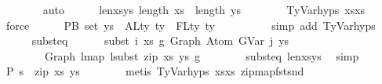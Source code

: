 \begin{isabellebody}
\ \ \ \ \ \ \isamarkupfalse%
\ auto\isanewline
\isanewline
\ \ \ \ \isamarkupfalse%
\ len{\isacharunderscore}{\kern0pt}xs{\isacharunderscore}{\kern0pt}ys{\isacharcolon}{\kern0pt}\ {\isachardoublequoteopen}length\ xs\ {\isacharequal}{\kern0pt}\ length\ ys{\isachardoublequoteclose}\isanewline
\ \ \ \ \ \ \isamarkupfalse%
\ TyVar{\isachardot}{\kern0pt}hyps{\isacharparenleft}{\kern0pt}{}{\isacharcomma}{\kern0pt}{}{\isacharparenright}{\kern0pt}\ xs{\isacharprime}{\kern0pt}{\isacharunderscore}{\kern0pt}xs\ \isamarkupfalse%
\ force\isanewline
\isanewline
\ \ \ \ \isamarkupfalse%
\ P{}B{\isacharcolon}{\kern0pt}\ {\isachardoublequoteopen}set\ ys\ {\isasyminter}\ ALty\ ty{\isacharprime}{\kern0pt}\ {\isacharminus}{\kern0pt}\ FLty\ ty{\isacharprime}{\kern0pt}\ {\isacharequal}{\kern0pt}\ {\isacharbraceleft}{\kern0pt}{\isacharbraceright}{\kern0pt}{\isachardoublequoteclose}\isanewline
\ \ \ \ \ \ \isamarkupfalse%
\ {\isacharparenleft}{\kern0pt}simp\ add{\isacharcolon}{\kern0pt}\ TyVar{\isachardot}{\kern0pt}hyps{\isacharparenleft}{\kern0pt}{}{\isacharparenright}{\kern0pt}{\isacharparenright}{\kern0pt}\isanewline
\isanewline
\ \ \ \ \isamarkupfalse%
\ subst{\isacharunderscore}{\kern0pt}eq{\isacharprime}{\kern0pt}{\isacharcolon}{\kern0pt}\isanewline
\ \ \ \ \ \ {\isachardoublequoteopen}subst\ i\ xs\ g{}\ {\isacharparenleft}{\kern0pt}Graph\ {\isacharparenleft}{\kern0pt}Atom\ {\isacharparenleft}{\kern0pt}GVar\ j{\isacharparenright}{\kern0pt}\ ys{\isacharparenright}{\kern0pt}{\isacharparenright}{\kern0pt}\isanewline
\ \ \ \ \ \ \ {\isacharequal}{\kern0pt}\ Graph\ {\isacharparenleft}{\kern0pt}lmap\ {\isacharparenleft}{\kern0pt}lsubst\ {\isacharparenleft}{\kern0pt}zip\ xs\ ys{\isacharparenright}{\kern0pt}{\isacharparenright}{\kern0pt}\ g{}{\isacharparenright}{\kern0pt}{\isachardoublequoteclose}\isanewline
\ \ \ \ \ \ \isamarkupfalse%
\ subst{\isacharunderscore}{\kern0pt}eq\ len{\isacharunderscore}{\kern0pt}xs{\isacharunderscore}{\kern0pt}ys\ \isamarkupfalse%
\ simp\isanewline
\isanewline
\ \ \ \ \isamarkupfalse%
\ P{}{\isacharcolon}{\kern0pt}\ {\isachardoublequoteopen}s\ {\isacharequal}{\kern0pt}\ zip\ xs\ ys{\isachardoublequoteclose}\isanewline
\ \ \ \ \ \ \isamarkupfalse%
\ {\isacharparenleft}{\kern0pt}metis\ TyVar{\isachardot}{\kern0pt}hyps{\isacharparenleft}{\kern0pt}{}{\isacharcomma}{\kern0pt}{}{\isacharparenright}{\kern0pt}\ xs{\isacharprime}{\kern0pt}{\isacharunderscore}{\kern0pt}xs\ zip{\isacharunderscore}{\kern0pt}map{\isacharunderscore}{\kern0pt}fst{\isacharunderscore}{\kern0pt}snd{\isacharparenright}{\kern0pt}\isanewline

\end{isabellebody}
